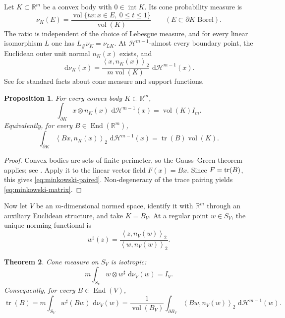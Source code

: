 \documentclass[11pt,a4paper]{amsart}
\numberwithin{equation}{section}
\theoremstyle{plain}
\newtheorem{theorem}{Theorem}[section]
\newtheorem{proposition}[theorem]{Proposition}
\theoremstyle{definition}
\theoremstyle{remark}
\DeclareMathOperator{\End}{End}
\DeclareMathOperator{\tr}{tr}
\DeclareMathOperator{\vol}{vol}
\let\div\relax
\DeclareMathOperator{\div}{div}
\newcommand{\R}{\mathbb{R}}
\newcommand{\dd}{\,\mathrm{d}}
\newcommand{\Id}{I}
\newcommand{\ip}[2]{\left\langle #1,#2\right\rangle_2}
\begin{document}
Let $K\subset\R^m$ be a convex body with $0\in\operatorname{int}K$. Its cone probability measure is
\begin{equation}\label{eq:cone-definition}
\nu_K(E)=\frac{\vol\{tx:x\in E,\ 0\leqslant t\leqslant1\}}{\vol(K)}
\qquad(E\subset\partial K\text{ Borel}).
\end{equation}
The ratio is independent of the choice of Lebesgue measure, and for every linear isomorphism $L$ one has $L_\#\nu_K=\nu_{LK}$. At $\mathcal H^{m-1}$-almost every boundary point, the Euclidean outer unit normal $n_K(x)$ exists, and
\begin{equation}\label{eq:cone-density}
\dd\nu_K(x)=\frac{\ip{x}{n_K(x)}}{m\vol(K)}\,\dd\mathcal H^{m-1}(x).
\end{equation}
See \cite{Gardner,Schneider} for standard facts about cone measure and support functions.

\begin{proposition}\label{prop:minkowski-matrix}
For every convex body $K\subset\R^m$,
\begin{equation}\label{eq:minkowski-matrix}
\int_{\partial K}x\otimes n_K(x)\,\dd\mathcal H^{m-1}(x)
=\vol(K)\Id_m.
\end{equation}
Equivalently, for every $B\in\End(\R^m)$,
\begin{equation}\label{eq:minkowski-paired}
\int_{\partial K}\ip{Bx}{n_K(x)}\,\dd\mathcal H^{m-1}(x)
=\tr(B)\vol(K).
\end{equation}
\end{proposition}

\begin{proof}
Convex bodies are sets of finite perimeter, so the Gauss--Green theorem applies; see \cite[Theorem~5.16]{EvansGariepy}. Apply it to the linear vector field $F(x)=Bx$. Since $\div F=\tr(B)$, this gives \eqref{eq:minkowski-paired}. Non-degeneracy of the trace pairing yields \eqref{eq:minkowski-matrix}.
\end{proof}

Now let $V$ be an $m$-dimensional normed space, identify it with $\R^m$ through an auxiliary Euclidean structure, and take $K=B_V$. At a regular point $w\in S_V$, the unique norming functional is
\begin{equation}\label{eq:norming-normal}
w^\sharp(z)=\frac{\ip{z}{n_V(w)}}{\ip{w}{n_V(w)}}.
\end{equation}

\begin{theorem}\label{thm:cone-isotropy}
Cone measure on $S_V$ is isotropic:
\begin{equation}\label{eq:cone-isotropy}
m\int_{S_V}w\otimes w^\sharp\,\dd\nu_V(w)=\Id_V.
\end{equation}
Consequently, for every $B\in\End(V)$,
\begin{equation}\label{eq:cone-trace-general}
\tr(B)
=m\int_{S_V}w^\sharp(Bw)\,\dd\nu_V(w)
=\frac1{\vol(B_V)}\int_{\partial B_V}\ip{Bw}{n_V(w)}\,\dd\mathcal H^{m-1}(w).
\end{equation}
\end{theorem}
\end{document}
